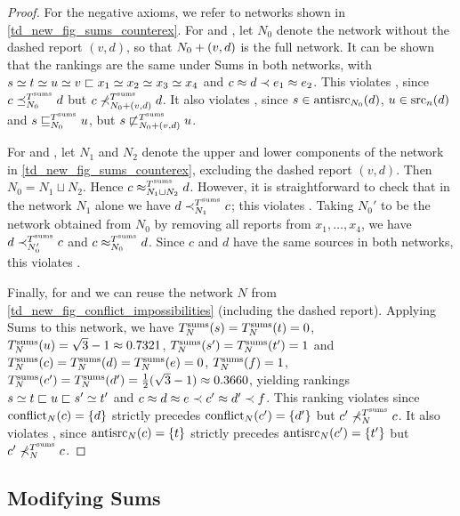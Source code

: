 \begin{proof}
    For the negative axioms, we refer to networks shown in
    \cref{td_new_fig_sums_counterex}.
    For \freshposresp{} and \sourceposresp{}, let $N_0$ denote the network
    without the dashed report $(v, d)$, so that ${N_0} + ({v}, {d})$ is the
    full network. It can be shown that the rankings are the same under Sums in
    both networks, with $s \simeq t \simeq u \simeq v \sqsubset x_1 \simeq x_2 \simeq x_3 \simeq
    x_4$ and $c \approx d \prec e_1 \approx e_2$. This violates \freshposresp{}, since
    $c \preceq_{N_0}^{T^{\operatorname{sums}}} d$ but $c \not\prec_{{N_0} + ({v}, {d})}^{T^{\operatorname{sums}}} d$.
    It also violates \sourceposresp{}, since $s \in \operatorname{antisrc}_{N_0}(d)$, $u \in
    \operatorname{src}_n(d)$ and $s \sqsubseteq_{N_0}^{T^{\operatorname{sums}}} u$, but $s
    \not\sqsubset_{{N_0} + ({v}, {d})}^{T^{\operatorname{sums}}} u$.

    For \classicalindependence{} and \disjointindependence{}, let $N_1$ and
    $N_2$ denote the upper and lower components of the network in
    \cref{td_new_fig_sums_counterex}, excluding the dashed report $(v, d)$.
    Then $N_0 = N_1 \sqcup N_2$. Hence $c \approx_{N_1 \sqcup N_2}^{T^{\operatorname{sums}}} d$.
    However, it is straightforward to check that in the network $N_1$ alone we
    have $d \prec_{N_1}^{T^{\operatorname{sums}}} c$; this violates \disjointindependence{}.
    Taking $N_0'$ to be the network obtained from $N_0$ by removing all
    reports from $x_1,\ldots,x_4$, we have $d \prec_{N_0'}^{T^{\operatorname{sums}}} c$ and $c
    \approx_{N_0}^{T^{\operatorname{sums}}} d$. Since $c$ and $d$ have the same sources in both
    networks, this violates \classicalindependence{}.

    Finally, for \conflictcoherence{} and \anticoherence{} we can reuse the
    network $N$ from \cref{td_new_fig_conflict_impossibilities} (including the
    dashed report). Applying Sums to this network, we have $T^{\operatorname{sums}}_N(s) =
    T^{\operatorname{sums}}_N(t) = 0$, $T^{\operatorname{sums}}_N(u) = \sqrt{3} - 1 \approx 0.7321$, $T^{\operatorname{sums}}_N(s') =
    T^{\operatorname{sums}}_N(t') = 1$ and $T^{\operatorname{sums}}_N(c) = T^{\operatorname{sums}}_N(d) = T^{\operatorname{sums}}_N(e) = 0$,
    $T^{\operatorname{sums}}_N(f) = 1$, $T^{\operatorname{sums}}_N(c') = T^{\operatorname{sums}}_N(d') = \frac{1}{2}(\sqrt{3} - 1)
    \approx 0.3660$, yielding rankings $s \simeq t \sqsubset u \sqsubset s' \simeq t'$ and $c
    \approx d \approx e \prec c' \approx d' \prec f$. This ranking violates
    \conflictcoherence{} since $\operatorname{conflict}_N(c) = \{d\}$ strictly precedes
    $\operatorname{conflict}_N(c') = \{d'\}$ but $c' \not\prec_N^{T^{\operatorname{sums}}} c$. It also violates
    \anticoherence{}, since $\operatorname{antisrc}_N(c) = \{t\}$ strictly precedes
    $\operatorname{antisrc}_N(c') = \{t'\}$ but $c' \not\prec_N^{T^{\operatorname{sums}}} c$.
\end{proof}

\subsection{Modifying Sums}

